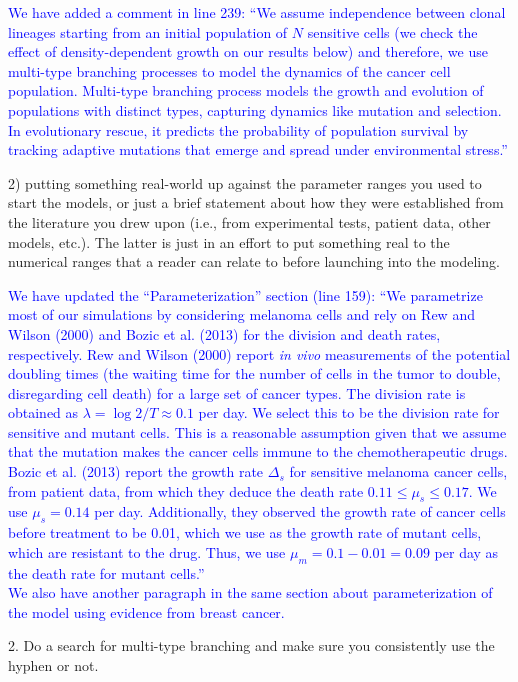\documentclass[12pt]{extarticle}
\begin{document}
\textcolor{blue}{ %
We have added a comment in line 239: ``We assume independence between clonal lineages starting from an initial population of $N$ sensitive cells (we check the effect of density-dependent growth on our results below) and therefore, we use multi-type branching processes to model the dynamics of the cancer cell population. Multi-type branching process models the growth and evolution of populations with distinct types, capturing dynamics like mutation and selection. In evolutionary rescue, it predicts the probability of population survival by tracking adaptive mutations that emerge and spread under environmental stress.''
}

2) putting something real-world up against the parameter ranges you used to start the models, or just a brief statement about how they were established from the literature you drew upon (i.e., from experimental tests, patient data, other models, etc.). The latter is just in an effort to put something real to the numerical ranges that a reader can relate to before launching into the modeling.

\textcolor{blue}{ %
We have updated the ``Parameterization'' section (line 159): ``We parametrize most of our simulations by considering melanoma cells and rely on Rew and Wilson (2000) and Bozic et al. (2013) for the division and death rates, respectively.  
Rew and Wilson (2000)  report \emph{in vivo} measurements of the potential doubling times (the waiting time for the number of cells in the tumor to double, disregarding cell death) for a large set of cancer types. The division rate is obtained as $\lambda=\log{2} / T \approx 0.1$ per day. We select this to be the division rate for sensitive and mutant cells. This is a reasonable assumption given that we assume that the mutation makes the cancer cells immune to the chemotherapeutic drugs. 
Bozic et al. (2013) report the growth rate $\Delta_s$ for sensitive melanoma cancer cells, from patient data, from which they deduce the death rate $0.11 \le \mu_s \le 0.17$. We use  $\mu_s=0.14$ per day. Additionally, they observed the growth rate of cancer cells before treatment to be 0.01, which we use as the growth rate of mutant cells, which are resistant to the drug. Thus, we use $\mu_m=0.1-0.01=0.09$ per day as the death rate for mutant cells.'' \\
We also have another paragraph in the same section about parameterization of the model using evidence from breast cancer.
} 

2. Do a search for multi-type branching and make sure you consistently use the hyphen or not.
\end{document}
